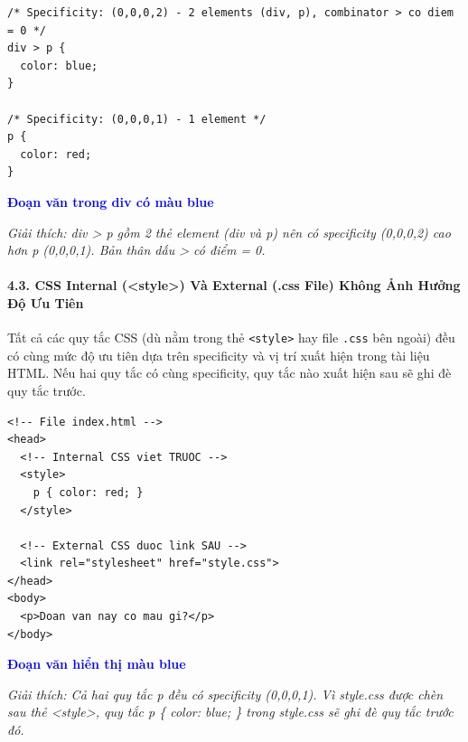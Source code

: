 \documentclass[11pt,oneside]{book}
\newcommand{\codeinline}[1]{\textcolor{accentOrange}{\texttt{#1}}}
\begin{document}
\begin{codeWindow}
\begin{lstlisting}[language=CSS3]
/* Specificity: (0,0,0,2) - 2 elements (div, p), combinator > co diem = 0 */
div > p {
  color: blue;
}

/* Specificity: (0,0,0,1) - 1 element */
p {
  color: red;
}
\end{lstlisting}
\end{codeWindow}

\begin{browserWindow}
\sffamily\small
\textcolor{blue}{\textbf{Đoạn văn trong div có màu blue}} \par\vspace{4pt}
{\scriptsize\textcolor{gray!60}{\textit{Giải thích: div > p gồm 2 thẻ element (div và p) nên có specificity (0,0,0,2) cao hơn p (0,0,0,1). Bản thân dấu > có điểm = 0.}}}
\end{browserWindow}

\paragraph{4.3. CSS Internal (<style>) Và External (.css File) Không Ảnh Hưởng Độ Ưu Tiên}

\begin{conceptBox}
Tất cả các quy tắc CSS (dù nằm trong thẻ \codeinline{<style>} hay file \codeinline{.css} bên ngoài) đều có cùng mức độ ưu tiên dựa trên specificity và vị trí xuất hiện trong tài liệu HTML. Nếu hai quy tắc có cùng specificity, quy tắc nào xuất hiện sau sẽ ghi đè quy tắc trước.
\end{conceptBox}

\begin{codeWindow}
\begin{lstlisting}[language=HTML5]
<!-- File index.html -->
<head>
  <!-- Internal CSS viet TRUOC -->
  <style>
    p { color: red; }
  </style>
  
  <!-- External CSS duoc link SAU -->
  <link rel="stylesheet" href="style.css">
</head>
<body>
  <p>Doan van nay co mau gi?</p>
</body>
\end{lstlisting}
\end{codeWindow}

\begin{browserWindow}
\sffamily\small
\textcolor{blue}{\textbf{Đoạn văn hiển thị màu blue}} \par\vspace{4pt}
{\scriptsize\textcolor{gray!60}{\textit{Giải thích: Cả hai quy tắc p đều có specificity (0,0,0,1). Vì style.css được chèn sau thẻ <style>, quy tắc p \{ color: blue; \} trong style.css sẽ ghi đè quy tắc trước đó.}}}
\end{browserWindow}
\end{document}
